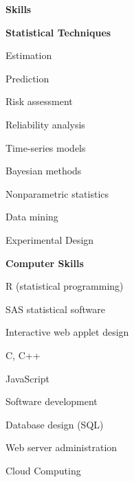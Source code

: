 \documentclass[letterpaper,12pt,final]{memoir}
\newcommand{\MedSep}{\vspace{1em}}
\newcommand{\SmallSep}{\vspace{0.5em}}
\newcommand{\CVSection}[1]
	{\Large\textbf{#1}\par
	\SmallSep\normalsize\normalfont}
\newcommand{\CVItem}[1]
	{\textbf{\color{RoyalBlue} #1}}
\begin{document}
\CVSection{Skills}
\CVItem{Statistical Techniques}
\begin{multicols}{3}
\begin{compactitem}[\color{RoyalBlue}$\bullet$]
	\item Estimation 
  \item Prediction
	\item Risk assessment
  \item Reliability analysis
	\item Time-series models
	\item Bayesian methods
  \item Nonparametric statistics
	\item Data mining
	\item Experimental Design
\end{compactitem}
\end{multicols}
\SmallSep
\CVItem{Computer Skills}
\begin{multicols}{3}
\begin{compactitem}[\color{RoyalBlue}$\bullet$]
	\item R (statistical programming)
  \item SAS statistical software
	\item Interactive web applet design
	\item C, C++
	\item JavaScript
	\item Software development
	\item Database design (SQL)
  \item Web server administration
  \item Cloud Computing
\end{compactitem}
\end{multicols}
\MedSep 
\end{document}
